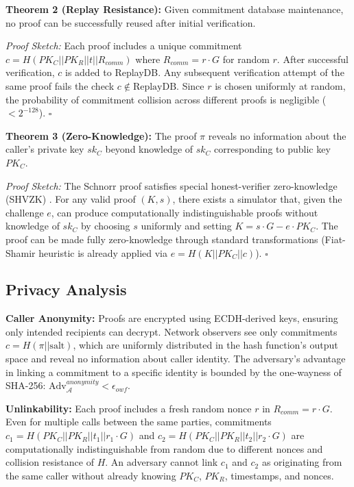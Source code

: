 \documentclass[11pt,twocolumn]{article}
\begin{document}
\textbf{Theorem 2 (Replay Resistance):} Given commitment database maintenance, no proof can be successfully reused after initial verification.

\textit{Proof Sketch:} Each proof includes a unique commitment $c = H(PK_C || PK_R || t || R_{comm})$ where $R_{comm} = r \cdot G$ for random $r$. After successful verification, $c$ is added to ReplayDB. Any subsequent verification attempt of the same proof fails the check $c \notin \text{ReplayDB}$. Since $r$ is chosen uniformly at random, the probability of commitment collision across different proofs is negligible ($< 2^{-128}$). $\square$

\textbf{Theorem 3 (Zero-Knowledge):} The proof $\pi$ reveals no information about the caller's private key $sk_C$ beyond knowledge of $sk_C$ corresponding to public key $PK_C$.

\textit{Proof Sketch:} The Schnorr proof satisfies special honest-verifier zero-knowledge (SHVZK) \cite{schnorr1991}. For any valid proof $(K, s)$, there exists a simulator that, given the challenge $e$, can produce computationally indistinguishable proofs without knowledge of $sk_C$ by choosing $s$ uniformly and setting $K = s \cdot G - e \cdot PK_C$. The proof can be made fully zero-knowledge through standard transformations (Fiat-Shamir heuristic is already applied via $e = H(K || PK_C || c)$). $\square$

\subsection{Privacy Analysis}

\textbf{Caller Anonymity:} Proofs are encrypted using ECDH-derived keys, ensuring only intended recipients can decrypt. Network observers see only commitments $c = H(\pi || \text{salt})$, which are uniformly distributed in the hash function's output space and reveal no information about caller identity. The adversary's advantage in linking a commitment to a specific identity is bounded by the one-wayness of SHA-256: $\text{Adv}_{\mathcal{A}}^{anonymity} < \epsilon_{owf}$.

\textbf{Unlinkability:} Each proof includes a fresh random nonce $r$ in $R_{comm} = r \cdot G$. Even for multiple calls between the same parties, commitments $c_1 = H(PK_C || PK_R || t_1 || r_1 \cdot G)$ and $c_2 = H(PK_C || PK_R || t_2 || r_2 \cdot G)$ are computationally indistinguishable from random due to different nonces and collision resistance of $H$. An adversary cannot link $c_1$ and $c_2$ as originating from the same caller without already knowing $PK_C$, $PK_R$, timestamps, and nonces.
\end{document}
